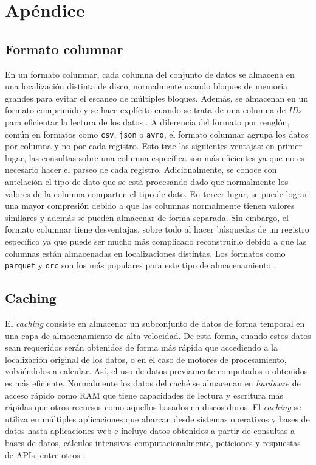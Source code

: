 \chapter{Apéndice}

\section{Formato columnar\label{formatocolumnar}}

\noindent En un formato columnar, cada columna del conjunto de datos se almacena en una localización distinta de disco, normalmente usando bloques de memoria grandes para evitar el escaneo de múltiples bloques. Además, se almacenan en un formato comprimido y se hace explícito cuando se trata de una columna de \textit{IDs} para eficientar la lectura de los datos \cite{column-oriented}. A diferencia del formato por renglón, común en formatos como \texttt{csv}, \texttt{json} o \texttt{avro}, el formato columnar agrupa los datos por columna y no por cada registro. Esto trae las siguientes ventajas: en primer lugar, las consultas sobre una columna específica son más eficientes ya que no es necesario hacer el parseo de cada registro. Adicionalmente, se conoce con antelación el tipo de dato que se está procesando dado que normalmente los valores de la columna comparten el tipo de dato. En tercer lugar, se puede lograr una mayor compresión debido a que las columnas normalmente tienen valores similares y además se pueden almacenar de forma separada. Sin embargo, el formato columnar tiene desventajas, sobre todo al hacer búsquedas de un registro específico ya que puede ser mucho más complicado reconstruirlo debido a que las columnas están almacenadas en localizaciones distintas. Los formatos como \texttt{parquet} y \texttt{orc} son los más populares para este tipo de almacenamiento \cite{columnar-storage-blog}.

\section{Caching \label{caching}}

El \textit{caching} consiste en almacenar un subconjunto de datos de forma temporal en una capa de almacenamiento de alta velocidad. De esta forma, cuando estos datos sean requeridos serán obtenidos de forma más rápida que accediendo a la localización original de los datos, o en el caso de motores de procesamiento, volviéndolos a calcular. Así, el uso de datos previamente computados o obtenidos es más eficiente. Normalmente los datos del caché se almacenan en \textit{hardware} de acceso rápido como RAM que tiene capacidades de lectura y escritura más rápidas que otros recursos como aquellos basados en discos duros. El \textit{caching} se utiliza en múltiples aplicaciones que abarcan desde sistemas operativos y bases de datos hasta aplicaciones web e incluye datos obtenidos a partir de consultas a bases de datos, cálculos intensivos computacionalmente, peticiones y respuestas de APIs, entre otros \cite{aws-caching}. 
